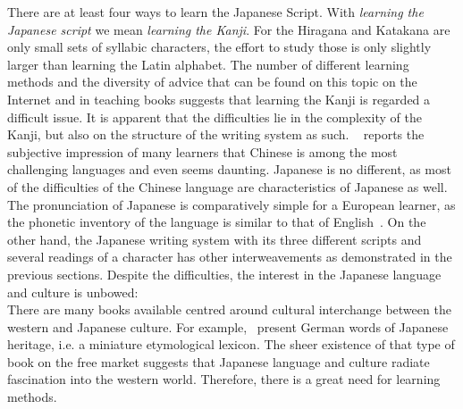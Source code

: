 There are at least four ways to learn the Japanese Script. 
With \emph{learning the Japanese script} we mean \emph{learning the Kanji}.
For the Hiragana and Katakana are only small sets of syllabic characters,
the effort to study those is only slightly larger than learning the Latin 
alphabet. The number of different learning methods and the diversity of advice
that can be found on this topic on the Internet and in teaching books suggests
that learning the Kanji is regarded a difficult issue.
It is apparent that the difficulties lie in the complexity of the Kanji, 
but also on the structure of the writing system as such. 
~\citeyear{Stahlmann2004} reports the subjective 
impression of many learners that Chinese is among the most challenging languages
and even seems daunting. Japanese is no different, as most of the difficulties 
of the Chinese language are characteristics of Japanese as well. 
The pronunciation of Japanese is comparatively simple for a European learner, 
as the phonetic inventory of the language is similar to that of 
English~. On the other hand, the Japanese writing 
system with its three different scripts and several readings of a character 
has other interweavements as demonstrated in the previous sections.
Despite the difficulties, the interest in the Japanese language and 
culture is unbowed:\\
There are many books available centred around cultural interchange between
the western and Japanese culture. For example,~ present
German words of Japanese heritage, i.e. a miniature etymological lexicon.
The sheer existence of that type of book on the free market suggests that 
Japanese language and culture radiate fascination into the western world.
Therefore, there is a great need for learning methods.

